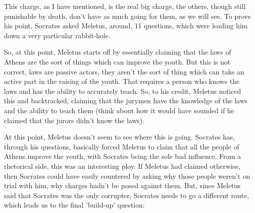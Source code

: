 This charge, as I have mentioned, is the real big charge, the others, though still punishable by death, don't have as much going for them, as we will see. To prove his point, Socrates asked Meletus, around, 11 questions, which were leading him down a very particular rabbit-hole.

So, at this point, Meletus starts off by essentially claiming that the laws of Athens are the sort of things which can improve the youth. But this is not correct, laws are passive actors, they aren't the sort of thing which can take an active part in the raising of the youth. That requires a person who knows the laws and has the ability to accurately teach. So, to his credit, Meletus noticed this and backtracked, claiming that the jurymen have the knowledge of the laws and the ability to teach them (think about how it would have sounded if he claimed that the jurors didn't know the laws).

At this point, Meletus doesn't seem to see where this is going. Socrates has, through his questions, basically forced Meletus to claim that all the people of Athens improve the youth, with Socrates being the sole bad influence. From a rhetorical side, this was an interesting ploy. If Meletus had claimed otherwise, then Socrates could have easily countered by asking why those people weren't on trial with him, why charges hadn't be posed against them. But, since Meletus said that Socrates was the only corrupter, Socrates needs to go a different route, which leads us to the final 'build-up' question:

